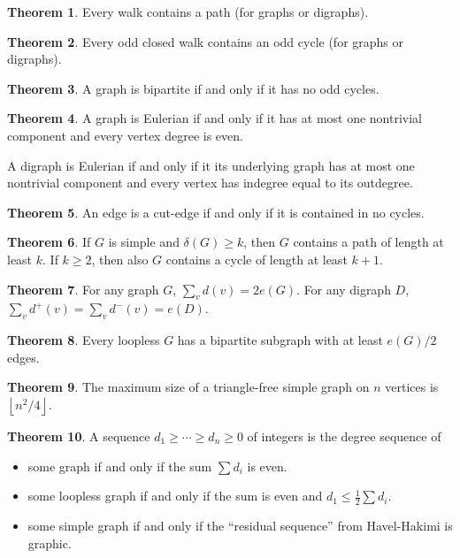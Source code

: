 \documentclass{article}
\newcommand{\floor}[1]{\left\lfloor#1\right\rfloor}
\theoremstyle{definition}
\newtheorem{theorem}{Theorem}
\begin{document}
\thispagestyle{empty}

\begin{theorem}
Every walk contains a path (for graphs or digraphs).
\end{theorem}
\begin{theorem}
Every odd closed walk contains an odd cycle (for graphs or digraphs).
\end{theorem}
\begin{theorem}
A graph is bipartite if and only if it has no odd cycles.
\end{theorem}

\begin{theorem}
A graph is Eulerian if and only if it has at most one nontrivial component and every vertex degree is even.

A digraph is Eulerian if and only if it its underlying graph has at most one nontrivial component and every vertex has indegree equal to its outdegree.
\end{theorem}

\begin{theorem}
An edge is a cut-edge if and only if it is contained in no cycles.
\end{theorem}

\begin{theorem}
If $G$ is simple and $\delta(G)\geq k$, then $G$ contains a path of length at least $k$.  If $k\geq2$, then also $G$ contains a cycle of length at least $k+1$.
\end{theorem}

\begin{theorem}
For any graph $G$, $\sum_{v} d(v)=2e(G)$.  For any digraph $D$, $\sum_v d^+(v)=\sum_v d^-(v)=e(D)$.
\end{theorem}

\begin{theorem}
Every loopless $G$ has a bipartite subgraph with at least $e(G)/2$ edges.
\end{theorem}
\begin{theorem}
The maximum size of a triangle-free simple graph on $n$ vertices is $\floor{n^2/4}$.
\end{theorem}


\begin{theorem}
A sequence $d_1\geq \dotsb \geq d_n\geq0$ of integers is the degree sequence of
\begin{itemize}
\item some graph if and only if the sum $\sum d_i$ is even.
\item some loopless graph if and only if the sum is even and $d_1\leq\frac12\sum d_i$.
\item some simple graph if and only if the ``residual sequence'' from Havel-Hakimi is graphic.
\end{itemize}
\end{theorem}
\end{document}
